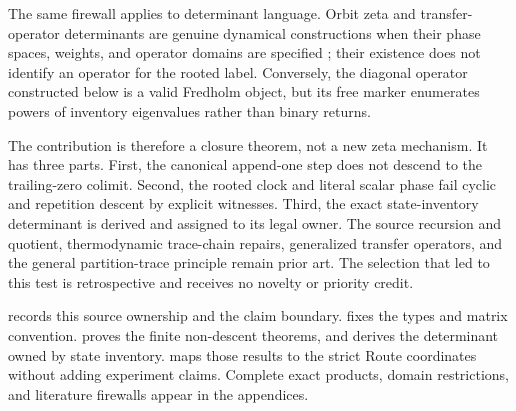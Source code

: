 The same firewall applies to determinant language.  Orbit zeta and
transfer-operator determinants are genuine dynamical constructions when
their phase spaces, weights, and operator domains are specified
\citep{ruelle1976zeta,mayer1990gauss,mayer1991selberg}; their existence does
not identify an operator for the rooted label.  Conversely, the diagonal
operator constructed below is a valid Fredholm object, but its free marker
enumerates powers of inventory eigenvalues rather than binary returns.

The contribution is therefore a closure theorem, not a new zeta mechanism.
It has three parts.  First, the canonical append-one step does not descend to
the trailing-zero colimit.  Second, the rooted clock and literal scalar phase
fail cyclic and repetition descent by explicit witnesses.  Third, the exact
state-inventory determinant is derived and assigned to its legal owner.  The
source recursion and quotient, thermodynamic trace-chain repairs,
generalized transfer operators, and the general partition-trace principle
remain prior art.  The selection that led to this test is retrospective and
receives no novelty or priority credit.

 records this source ownership and the claim boundary.
 fixes the types and matrix convention.
 proves the finite non-descent theorems, and
 derives the determinant owned by state inventory.
 maps those results to the strict Route coordinates without
adding experiment claims.  Complete exact products, domain restrictions, and
literature firewalls appear in the appendices.
